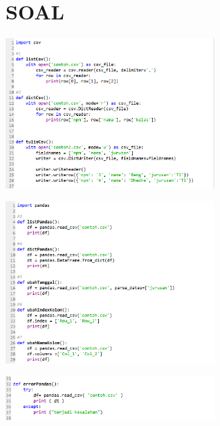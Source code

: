 \documentclass{article}
\begin{document}
\section{SOAL}

\begin{center}
    \includegraphics[width=8cm]{figure/soal1.png}
\end{center}
\begin{center}
    \includegraphics[width=8cm]{figure/soal2.png}
\end{center}
\begin{center}
    \includegraphics[width=8cm]{figure/soal3.png}
\end{center}
\end{document}
